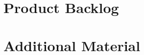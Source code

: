 {}



\cleardoublepage
\pagestyle{report}

\appendix

\section{Product Backlog}


\cleardoublepage 



\section{Additional Material}


